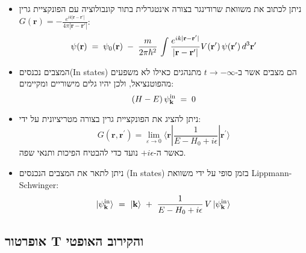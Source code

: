 \documentclass{tstextbook}
\begin{document}
\begin{summary}
  \begin{itemize}
    \item ניתן לכתוב את משוואת שרודינגר בצורה אינטגרלית בתור קונבולוציה עם הפונקציית גרין \(G\left( \mathbf{r} \right)=-\frac{e^{i k |\mathbf{r}-\mathbf{r}'|}}{4\pi |\mathbf{r}-\mathbf{r}'|}\):
$$\psi({\bf r})\;=\;\psi_{0}({\bf r})\;-\;\frac{m}{2\pi\hbar^{2}}\,\int\frac{e^{i k|{\bf r}-{\bf r}^{\prime}|}}{|{\bf r}-{\bf r}^{\prime}|}V({\bf r}^{\prime})\,\psi({\bf r}^{\prime})\,d^{3}{\bf r}^{\prime}$$
    \item המצבים נכנסים(In states) הם מצבים אשר ב-\(t\to -\infty\) מתנהגים כאילו לא משפעים מהפוטנציאל, ולכן יהיו גלים מישוריים ומקיימים:
$$\left(H-E\right)\psi_{\bf k}^{\mathrm{in}}\;=\;0$$
    \item ניתן להציג את הפונקציית גרין בצורה מטריציונית על ידי:
$$G(\mathbf{r},\mathbf{r^{\prime}})=\lim_{ \varepsilon \to 0 } \langle\mathbf{r}|{\frac{1}{E-H_{0}+i\epsilon}}|\mathbf{r^{\prime}}\rangle$$
כאשר ה-\(+i\epsilon\) נועד כדי להבטיח הפיכות ותנאי שפה.
    \item ניתן לתאר את המצבים הנכנסים (In states) בזמן סופי על ידי משוואת Lippmann-Schwinger:
$$|\psi_{\bf k}^{\mathrm{in}}\rangle\ =\ |{\bf k}\rangle\ +\ \frac{1}{E-H_{0}+i\epsilon}\,V\,|\psi_{\bf k}^{\mathrm{in}}\rangle$$
  \end{itemize}
\end{summary}
\subsection{אופרטור T והקירוב האופטי}
\end{document}
